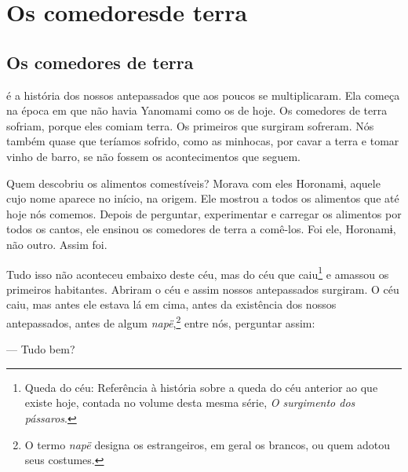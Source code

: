 
\part[Os comedores de terra]{Os comedores\break de terra}

\chapter{Os comedores de terra}

 é a história dos nossos antepassados que aos poucos se
multiplicaram. Ela começa na época em que não havia Yanomami como os de
hoje. Os comedores de terra sofriam, porque eles comiam terra. Os
primeiros que surgiram sofreram. Nós também quase que teríamos sofrido,
como as minhocas, por cavar a terra e tomar vinho de barro, se não
fossem os acontecimentos que seguem.	


Quem descobriu os alimentos comestíveis? Morava com eles Horonamɨ,
aquele cujo nome aparece no início, na origem. Ele mostrou a todos os
alimentos que até hoje nós comemos. Depois de perguntar, experimentar e
carregar os alimentos por todos os cantos, ele ensinou os comedores de
terra a comê-los. Foi ele, Horonamɨ, não outro. Assim foi.

Tudo isso não aconteceu embaixo deste céu, mas do céu que caiu\footnote{Queda do céu: Referência à história sobre a queda do céu anterior ao que existe hoje, contada no volume desta mesma série, \textit{O surgimento dos pássaros}.} e amassou
os primeiros habitantes. Abriram o céu e assim nossos antepassados
surgiram. O céu caiu, mas antes ele estava lá em cima, antes da
existência dos nossos antepassados, antes de algum \textit{napë},\footnote{O termo \textit{napë} designa os estrangeiros, em geral os brancos, ou quem adotou seus costumes.} entre
nós, perguntar assim:

--- Tudo bem? 



